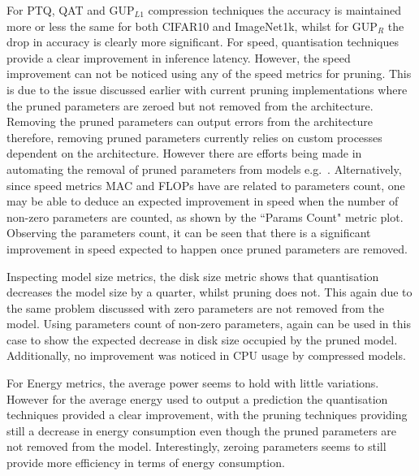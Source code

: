For PTQ, QAT and GUP$_{L1}$ compression techniques the accuracy is maintained more or less the same for both CIFAR10 and ImageNet1k, whilst for GUP$_{R}$ the drop in accuracy is clearly more significant.
%
For speed, quantisation techniques provide a clear improvement in inference latency. However, the speed improvement can not be noticed using any of the speed metrics for pruning. This is due to the issue discussed earlier with current pruning implementations where the pruned parameters are zeroed but not removed from the architecture. Removing the pruned parameters can output errors from the architecture therefore, removing pruned parameters currently relies on custom processes dependent on the architecture. However there are efforts being made in automating the removal of pruned parameters from models e.g.~\cite{fang2023depgraph}. 
%
Alternatively, since speed metrics MAC and FLOPs have are related to parameters count, one may be able to deduce an expected improvement in speed when the number of non-zero parameters are counted, as shown by the ``Params Count" metric plot. Observing the parameters count, it can be seen that there is a significant improvement in speed expected to happen once pruned parameters are removed. %

Inspecting model size metrics, the disk size metric shows that quantisation decreases the model size by a quarter, whilst pruning does not. This again due to the same problem discussed with zero parameters are not removed from the model. Using parameters count of non-zero parameters, again can be used in this case to show the expected decrease in disk size occupied by the pruned model. Additionally, no improvement was noticed in CPU usage by compressed models.
%

For Energy metrics, the average power seems to hold with little variations.%
However for the average energy used to output a prediction the quantisation techniques provided a clear improvement, with the pruning techniques providing still a decrease in energy consumption even though the pruned parameters are not removed from the model. Interestingly, zeroing parameters seems to still provide more efficiency in terms of energy consumption. 


